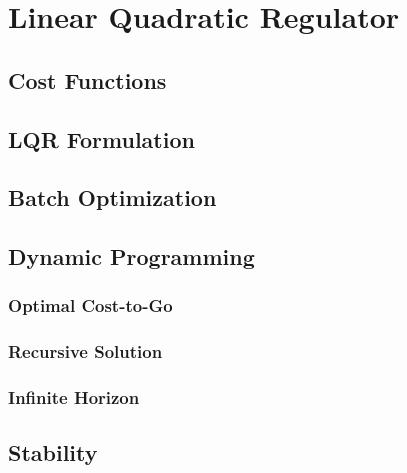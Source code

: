     \section{Linear Quadratic Regulator} %

        \subsection{Cost Functions} %

        \subsection{LQR Formulation} %

        \subsection{Batch Optimization} %

        \subsection{Dynamic Programming} %

            \subsubsection{Optimal Cost-to-Go} %

            \subsubsection{Recursive Solution} %

            \subsubsection{Infinite Horizon} %

        \subsection{Stability} %

